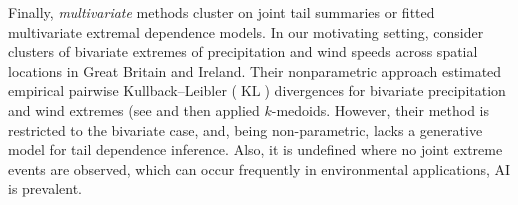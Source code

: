 \documentclass[12pt]{article}
\DeclareMathOperator{\KL}{\mathrm{KL}}
\begin{document}
Finally, \emph{multivariate} methods cluster on joint tail summaries or fitted multivariate extremal dependence models. 
In our motivating setting, \citet{Vignotto2021} consider clusters of bivariate extremes of precipitation and wind speeds across spatial locations in Great Britain and Ireland.
Their nonparametric approach estimated empirical pairwise Kullback--Leibler ($\KL{}$) \citep{Kullback1951} divergences for bivariate precipitation and wind extremes (see \citet{Zscheischler2021} and then applied $k$-medoids. %
However, their method is restricted to the bivariate case, and,
being non-parametric, lacks a generative model for tail dependence inference. %
Also, it is undefined where no joint extreme events are observed, which can occur frequently in environmental applications, AI is prevalent.
\end{document}
